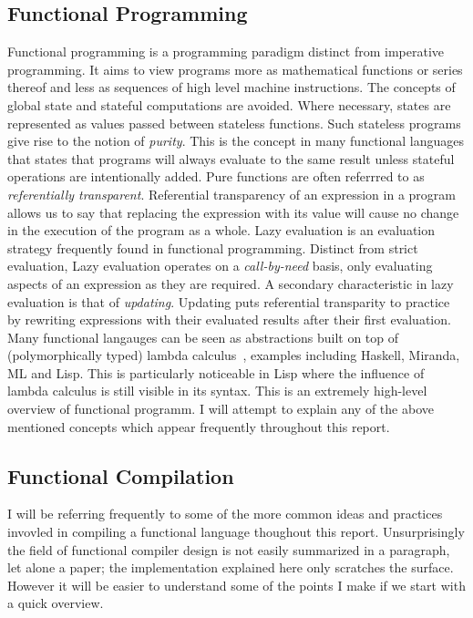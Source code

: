\subsection{Functional Programming}
Functional programming is a programming paradigm distinct from imperative
programming. It aims to view programs more as mathematical functions or series
thereof and less as sequences of high level machine instructions. The concepts
of global state and stateful computations are avoided. Where necessary, states
are represented as values passed between stateless functions. Such stateless
programs give rise to the notion of \emph{purity}. This is the concept in many functional
languages that states that programs will always evaluate to the same result unless
stateful operations are intentionally added. Pure functions are often referrred
to as \emph{referentially transparent}. Referential transparency of an expression in a
program allows us to say that replacing the expression with its value will cause
no change in the execution of the program as a whole. Lazy evaluation is an
evaluation strategy frequently found in functional programming. Distinct from
strict evaluation, Lazy evaluation operates on a \emph{call-by-need} basis, only
evaluating aspects of an expression as they are required. A secondary characteristic
in lazy evaluation is that of \emph{updating}. Updating puts referential
transparity to practice by rewriting expressions with their evaluated results after
their first evaluation. Many functional langauges can be seen as abstractions built
on top of (polymorphically typed) lambda calculus~\cite[pp.37]{SPJ}, examples including 
Haskell, Miranda, ML and Lisp. This is particularly noticeable in Lisp where the 
influence of lambda calculus is still visible in its syntax. This is an extremely high-level
overview of functional programm. I will attempt to explain any of the above mentioned
concepts which appear frequently throughout this report. 

\subsection{Functional Compilation}
I will be referring frequently to some of the more common ideas and practices
invovled in compiling a functional language thoughout this report. Unsurprisingly
the field of functional compiler design is not easily summarized in a paragraph,
let alone a paper; the implementation explained here only scratches the surface.
However it will be easier to understand some of the points I make if we start
with a quick overview.

